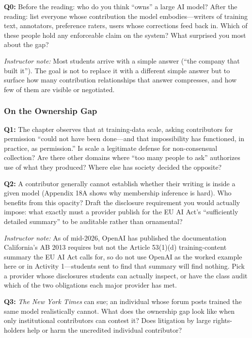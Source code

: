 \textbf{Q0:} Before the reading: who do you think ``owns'' a large AI model? After the reading: list everyone whose contribution the model embodies---writers of training text, annotators, preference raters, users whose corrections feed back in. Which of these people hold any enforceable claim on the system? What surprised you most about the gap?

\textit{Instructor note:} Most students arrive with a simple answer (``the company that built it''). The goal is not to replace it with a different simple answer but to surface how many contribution relationships that answer compresses, and how few of them are visible or negotiated.

\subsubsection*{On the Ownership Gap}

\textbf{Q1:} The chapter observes that at training-data scale, asking contributors for permission ``could not have been done---and that impossibility has functioned, in practice, as permission.'' Is scale a legitimate defense for non-consensual collection? Are there other domains where ``too many people to ask'' authorizes use of what they produced? Where else has society decided the opposite?

\textbf{Q2:} A contributor generally cannot establish whether their writing is inside a given model (Appendix 18A shows why membership inference is hard). Who benefits from this opacity? Draft the disclosure requirement you would actually impose: what exactly must a provider publish for the EU AI Act's ``sufficiently detailed summary'' to be auditable rather than ornamental?

\textit{Instructor note:} As of mid-2026, OpenAI has published the documentation California's AB 2013 requires but not the Article 53(1)(d) training-content summary the EU AI Act calls for, so do not use OpenAI as the worked example here or in Activity 1---students sent to find that summary will find nothing. Pick a provider whose disclosures students can actually inspect, or have the class audit which of the two obligations each major provider has met.

\textbf{Q3:} \textit{The New York Times} can sue; an individual whose forum posts trained the same model realistically cannot. What does the ownership gap look like when only institutional contributors can contest it? Does litigation by large rights-holders help or harm the uncredited individual contributor?

